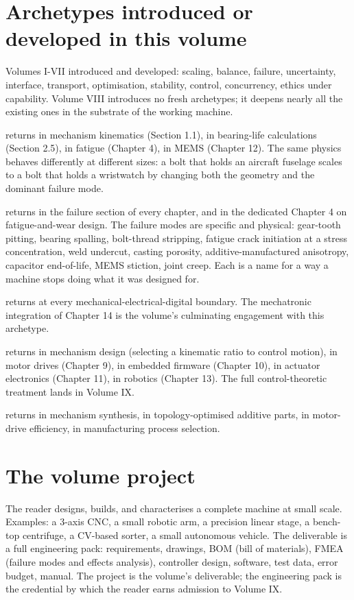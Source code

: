 \section*{Archetypes introduced or developed in this volume}

Volumes I-VII introduced and developed: scaling, balance, failure, uncertainty, interface, transport, optimisation, stability, control, concurrency, ethics under capability. Volume VIII introduces no fresh archetypes; it deepens nearly all the existing ones in the substrate of the working machine.

 returns in mechanism kinematics (Section 1.1), in bearing-life calculations (Section 2.5), in fatigue (Chapter 4), in MEMS (Chapter 12). The same physics behaves differently at different sizes: a bolt that holds an aircraft fuselage scales to a bolt that holds a wristwatch by changing both the geometry and the dominant failure mode.

 returns in the failure section of every chapter, and in the dedicated Chapter 4 on fatigue-and-wear design. The failure modes are specific and physical: gear-tooth pitting, bearing spalling, bolt-thread stripping, fatigue crack initiation at a stress concentration, weld undercut, casting porosity, additive-manufactured anisotropy, capacitor end-of-life, MEMS stiction, joint creep. Each is a name for a way a machine stops doing what it was designed for.

 returns at every mechanical-electrical-digital boundary. The mechatronic integration of Chapter 14 is the volume's culminating engagement with this archetype.

 returns in mechanism design (selecting a kinematic ratio to control motion), in motor drives (Chapter 9), in embedded firmware (Chapter 10), in actuator electronics (Chapter 11), in robotics (Chapter 13). The full control-theoretic treatment lands in Volume IX.

 returns in mechanism synthesis, in topology-optimised additive parts, in motor-drive efficiency, in manufacturing process selection.

\section*{The volume project}

The reader designs, builds, and characterises a complete machine at small scale. Examples: a 3-axis CNC, a small robotic arm, a precision linear stage, a bench-top centrifuge, a CV-based sorter, a small autonomous vehicle. The deliverable is a full engineering pack: requirements, drawings, BOM (bill of materials), FMEA (failure modes and effects analysis), controller design, software, test data, error budget, manual. The project is the volume's deliverable; the engineering pack is the credential by which the reader earns admission to Volume IX.

